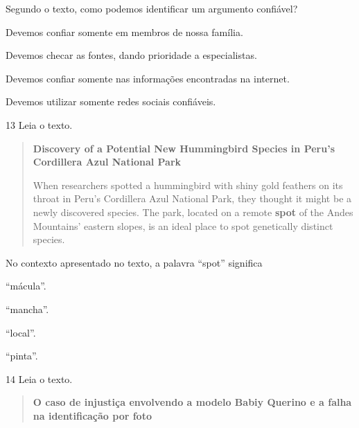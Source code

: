 \begin{escolha}
\begin{escolha}
\begin{escolha}
Segundo o texto, como podemos identificar um argumento confiável?

\begin{escolha}
\item Devemos confiar somente em membros de nossa família.

\item Devemos checar as fontes, dando prioridade a especialistas.

\item Devemos confiar somente nas informações encontradas na internet.

\item Devemos utilizar somente redes sociais confiáveis.
\end{escolha}

\num{13} Leia o texto.

\begin{quote}
\textbf{Discovery of a Potential New Hummingbird Species in Peru's
Cordillera Azul National Park}

When researchers spotted a hummingbird with shiny gold feathers on its
throat in Peru's Cordillera Azul National Park, they thought it might be
a newly discovered species. The park, located on a remote \textbf{spot}
of the Andes Mountains' eastern slopes, is an ideal place to spot
genetically distinct species.

\end{quote}

No contexto apresentado no texto, a palavra ``spot'' significa

\begin{escolha}
\item ``mácula''.

\item ``mancha''.

\item ``local''.

\item ``pinta''.
\end{escolha}

\num{14} Leia o texto.

\begin{quote}
\textbf{O caso de injustiça envolvendo a modelo Babiy Querino e a falha na identificação por foto}


\end{quote}
\end{escolha}
\end{escolha}
\end{escolha}
